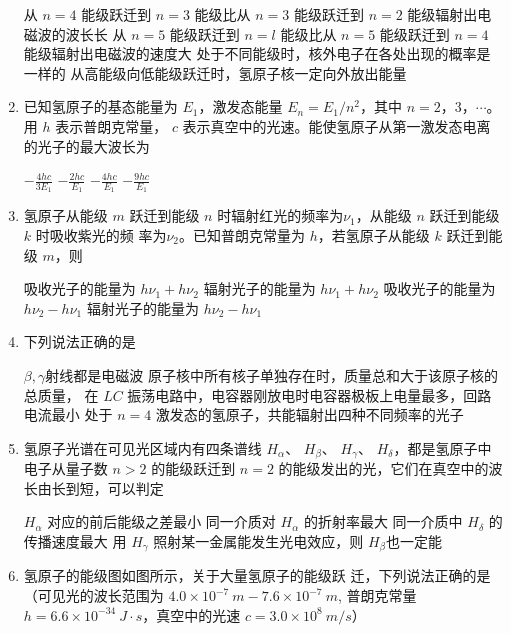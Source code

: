 \begin{enumerate}
\fourchoices
{从 $ n=4 $ 能级跃迁到 $ n=3 $ 能级比从 $ n=3 $ 能级跃迁到 $ n=2 $ 能级辐射出电磁波的波长长}
{从 $ n=5 $ 能级跃迁到 $ n=l $ 能级比从 $ n=5 $ 能级跃迁到 $ n=4 $ 能级辐射出电磁波的速度大}
{处于不同能级时，核外电子在各处出现的概率是一样的}
{从高能级向低能级跃迁时，氢原子核一定向外放出能量}

\item 
{}
已知氢原子的基态能量为 $ E_{1} $，激发态能量 $ E_{n}= E_{1} / n^{2} $，其中 $ n=2 $，$ 3 $，$ \cdots $。用 $ h $ 表示普朗克常量，
$ c $ 表示真空中的光速。能使氢原子从第一激发态电离的光子的最大波长为  


\fourchoices
{$-\frac{4 h c}{3 E_{1}}$}
{$-\frac{2 h c}{E_{1}} $}
{$-\frac{4 h c}{E_{1}} $}
{$-\frac{9 h c}{E_{1}}$}

\item 
{}
氢原子从能级 $ m $ 跃迁到能级 $ n $ 时辐射红光的频率为$ \nu _{1} $，从能级 $ n $ 跃迁到能级 $ k $ 时吸收紫光的频
率为$ \nu _{2} $。已知普朗克常量为 $ h $，若氢原子从能级 $ k $ 跃迁到能级 $ m $，则  

\fourchoices
{吸收光子的能量为 $ h \nu _{1} +h \nu _{2} $}
{辐射光子的能量为 $ h \nu _{1} +h \nu _{2} $}
{吸收光子的能量为 $ h \nu _{2} -h \nu _{1} $}
{辐射光子的能量为 $ h \nu _{2} -h \nu _{1} $}

\item 
{}
下列说法正确的是  

\fourchoices
{$ \beta , \gamma $射线都是电磁波}
{原子核中所有核子单独存在时，质量总和大于该原子核的总质量，}
{在 $ LC $ 振荡电路中，电容器刚放电时电容器极板上电量最多，回路电流最小}
{处于 $ n=4 $ 激发态的氢原子，共能辐射出四种不同频率的光子}


\item 
{}
氢原子光谱在可见光区域内有四条谱线 $ H_{ \alpha } $、 $ H_{\beta} $、 $ H_{\gamma} $、 $ H_{\delta} $，都是氢原子中
电子从量子数 $ n>2 $ 的能级跃迁到 $ n=2 $ 的能级发出的光，它们在真空中的波长由长到短，可以判定  

\fourchoices
{$ H_{ \alpha } $ 对应的前后能级之差最小}
{同一介质对 $ H_{ \alpha } $ 的折射率最大}
{同一介质中 $ H_{\delta} $ 的传播速度最大}
{用 $ H_{\gamma} $ 照射某一金属能发生光电效应，则 $ H_{\beta} $也一定能}


\item 
{}
氢原子的能级图如图所示，关于大量氢原子的能级跃
迁，下列说法正确的是（可见光的波长范围为 $ 4.0 \times 10^{-7} \ m - 7.6 \times 10^{-7} \ m $,
普朗克常量 $ h=6.6 \times 10^{-34} \ J \cdot s $，真空中的光速 $ c=3.0 \times 10^{8} \ m /s $）  
\begin{figure}[h!]
	\centering
	
\end{figure}



\end{enumerate}
